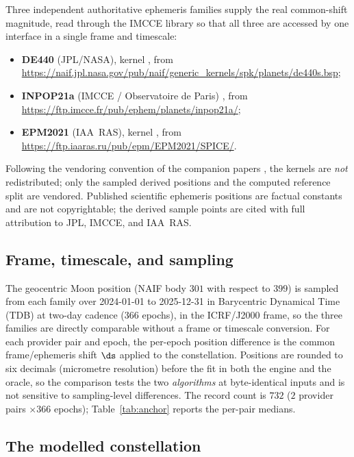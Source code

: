 Three independent authoritative ephemeris families supply the real common-shift
magnitude, read through the IMCCE  library so that all three are accessed
by one interface in a single frame and timescale:
\begin{itemize}
  \item \textbf{DE440} (JPL/NASA), kernel  \citep{park2021de440}, from
  \url{https://naif.jpl.nasa.gov/pub/naif/generic_kernels/spk/planets/de440s.bsp};
  \item \textbf{INPOP21a} (IMCCE / Observatoire de Paris)
  \citep{fienga2021inpop21a}, from \url{https://ftp.imcce.fr/pub/ephem/planets/inpop21a/};
  \item \textbf{EPM2021} (IAA~RAS), kernel 
  \citep{pitjeva2021epm2021}, from \url{https://ftp.iaaras.ru/pub/epm/EPM2021/SPICE/}.
\end{itemize}
Following the vendoring convention of the companion papers \citep{baweja2026datum,%
baweja2026interop}, the kernels are \emph{not} redistributed; only the sampled derived
positions and the computed reference split are vendored. Published scientific ephemeris
positions are factual constants and are not copyrightable; the derived sample points are
cited with full attribution to JPL, IMCCE, and IAA~RAS.

\subsection{Frame, timescale, and sampling}
\label{app:sampling}

The geocentric Moon position (NAIF body $301$ with respect to $399$) is sampled from
each family over 2024-01-01 to 2025-12-31 in Barycentric Dynamical Time (TDB) at two-day
cadence ($366$ epochs), in the ICRF/J2000 frame, so the three families are directly
comparable without a frame or timescale conversion. For each provider pair and epoch, the
per-epoch position difference is the common frame/ephemeris shift $\ds$ applied to the
constellation. Positions are rounded to six decimals (micrometre resolution) before the
fit in both the engine and the oracle, so the comparison tests the two \emph{algorithms}
at byte-identical inputs and is not sensitive to sampling-level differences. The record
count is $732$ ($2$ provider pairs $\times366$ epochs); Table~\ref{tab:anchor} reports
the per-pair medians.

\subsection{The modelled constellation}
\label{app:constellation}

